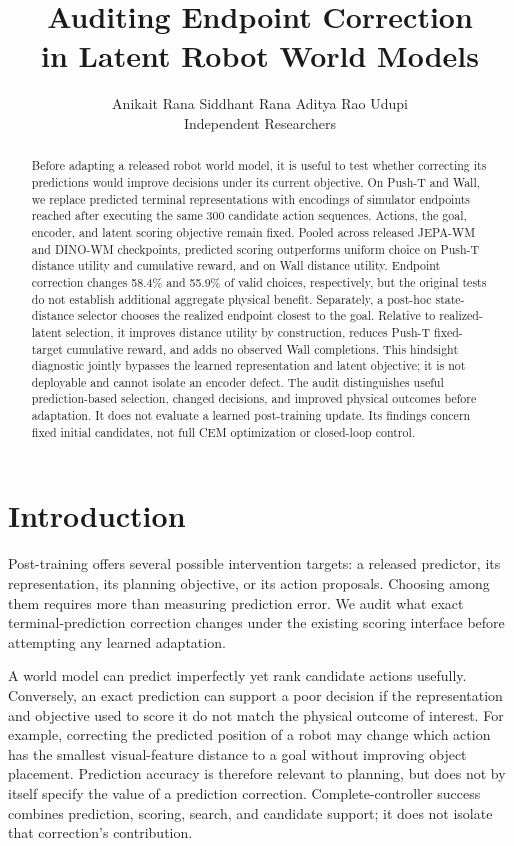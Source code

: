 \documentclass{article}
\title{Auditing Endpoint Correction\\in Latent Robot World Models}
\author{Anikait Rana \qquad
Siddhant Rana \qquad Aditya Rao Udupi\\
Independent Researchers}
\begin{document}
\maketitle

\begin{abstract}
Before adapting a released robot world model, it is useful to test whether
correcting its predictions would improve decisions under its current objective.
On Push-T and Wall, we replace
predicted terminal representations with encodings of simulator endpoints reached
after executing the same 300 candidate action sequences. Actions, the goal,
encoder, and latent scoring objective remain fixed. Pooled across released
JEPA-WM and DINO-WM checkpoints, predicted scoring outperforms uniform choice on Push-T
distance utility and cumulative reward, and on Wall distance utility.
Endpoint correction changes 58.4\% and 55.9\% of valid choices, respectively,
but the original tests do not establish additional aggregate physical benefit.
Separately, a post-hoc state-distance selector chooses the realized endpoint
closest to the goal. Relative to realized-latent selection, it improves distance
utility by construction, reduces Push-T fixed-target cumulative reward, and
adds no observed Wall completions.
This hindsight diagnostic jointly bypasses the learned representation and
latent objective; it is not deployable and cannot isolate an encoder defect.
The audit distinguishes useful prediction-based selection, changed decisions,
and improved physical outcomes before adaptation. It does not evaluate a
learned post-training update. Its findings concern fixed initial candidates,
not full CEM optimization or closed-loop control.
\end{abstract}

\section{Introduction}

Post-training offers several possible intervention targets: a released
predictor, its representation, its planning objective, or its action proposals.
Choosing among them requires more than measuring prediction error. We audit
what exact terminal-prediction correction changes under the existing scoring
interface before attempting any learned adaptation.

A world model can predict imperfectly yet rank candidate actions usefully.
Conversely, an exact prediction can support a poor decision if the representation
and objective used to score it do not match the physical outcome of interest.
For example, correcting the predicted position of a robot may change which
action has the smallest visual-feature distance to a goal without improving
object placement. Prediction accuracy is therefore relevant to planning, but
does not by itself specify the value of a prediction correction.
Complete-controller success combines prediction, scoring, search, and candidate
support; it does not isolate that correction's contribution.
\end{document}
